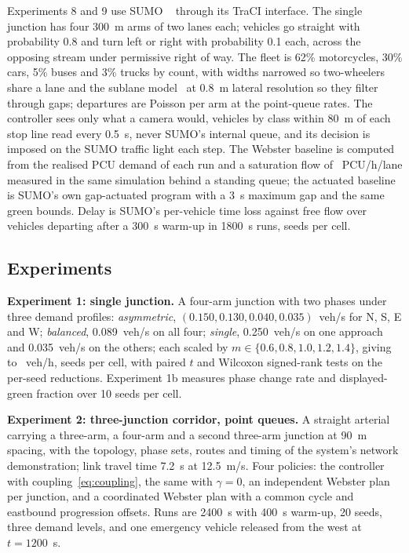 \documentclass[journal]{IEEEtran}
\newcommand{\pcu}{PCU}
\begin{document}
Experiments 8 and 9 use SUMO \SumoVersion~\cite{lopez2018microscopic} through its TraCI interface. The single
junction has four 300~m arms of two lanes each; vehicles go straight with probability 0.8 and turn left or
right with probability 0.1 each, across the opposing stream under permissive right of way. The fleet is
62\% motorcycles, 30\% cars, 5\% buses and 3\% trucks by count, with widths narrowed so two-wheelers share a
lane and the sublane model~\cite{erdmann2015lanechange} at 0.8~m lateral resolution so they filter through
gaps; departures are Poisson per arm at the point-queue rates. The controller sees only what a camera would,
vehicles by class within 80~m of each stop line read every 0.5~s, never SUMO's internal queue, and its
decision is imposed on the SUMO traffic light each step. The Webster baseline is computed from the realised
\pcu{} demand of each run and a saturation flow of \SumoSat~\pcu/h/lane measured in the same simulation
behind a standing queue; the actuated baseline is SUMO's own gap-actuated program with a 3~s maximum gap and
the same green bounds. Delay is SUMO's per-vehicle time loss against free flow over vehicles departing after
a 300~s warm-up in 1800~s runs, \SumoSeeds{} seeds per cell.

\subsection{Experiments}

\textbf{Experiment 1: single junction.} A four-arm junction with two phases under three demand profiles:
\emph{asymmetric}, $(0.150, 0.130, 0.040, 0.035)$~veh/s for N, S, E and W; \emph{balanced}, 0.089~veh/s on all
four; \emph{single}, 0.250~veh/s on one approach and 0.035~veh/s on the others; each scaled by
$m \in \{0.6, 0.8, 1.0, 1.2, 1.4\}$, giving \DemandLow{} to \DemandHigh~veh/h, \ExpOneSeeds{} seeds per cell,
with paired $t$ and Wilcoxon signed-rank tests on the per-seed reductions. Experiment 1b measures phase change
rate and displayed-green fraction over 10 seeds per cell.

\textbf{Experiment 2: three-junction corridor, point queues.} A straight arterial carrying a three-arm, a
four-arm and a second three-arm junction at 90~m spacing, with the topology, phase sets, routes and timing of
the system's network demonstration; link travel time 7.2~s at 12.5~m/s. Four policies: the controller with
coupling~\eqref{eq:coupling}, the same with $\gamma = 0$, an independent Webster plan per junction, and a
coordinated Webster plan with a common cycle and eastbound progression offsets. Runs are 2400~s with 400~s
warm-up, 20 seeds, three demand levels, and one emergency vehicle released from the west at $t = 1200$~s.
\end{document}
